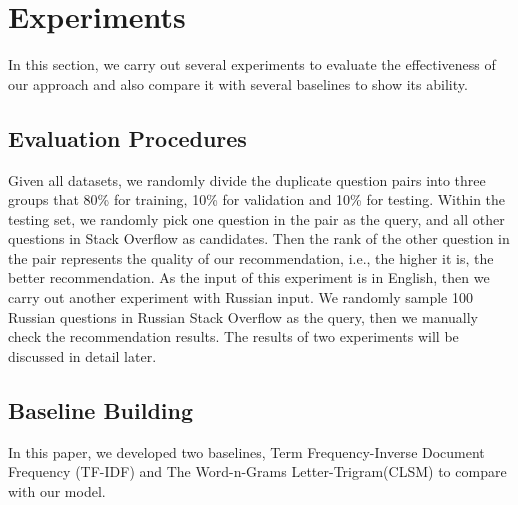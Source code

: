 \section{Experiments}
In this section, we carry out several experiments to evaluate the effectiveness of our approach and also compare it with several baselines to show its ability. 

\subsection{Evaluation Procedures}
Given all datasets, we randomly divide the duplicate question pairs into three groups that 80\% for training, 10\% for validation and 10\% for testing. 
Within the testing set, we randomly pick one question in the pair as the query, and all other questions in Stack Overflow as candidates.
Then the rank of the other question in the pair represents the quality of our recommendation, i.e., the higher it is, the better recommendation.
As the input of this experiment is in English, then we carry out another experiment with Russian input.
We randomly sample 100 Russian questions in Russian Stack Overflow as the query, then we manually check the recommendation results.
The results of two experiments will be discussed in detail later.
 
\begin{comment}
The 80\% subset is mix up with 0.15 million non-duplicate pairs for training the DSSM model, the first 10\% subset is used for validation, and the last 10\% subset is used for the comparison process between our approach and the baselines. 
The main data source of our research is from the Stack Exchange data dump of  1st Sep. 2017 [1]. As all the duplicate pairs have been manually marked by experts on Stack Overflow, we can collect 0.31 million duplicate question pairs. In addition, we can generate as many non-duplicate question pairs as we want.  \par
\end{comment}

\subsection{Baseline Building}
In this paper, we developed two baselines, Term Frequency-Inverse Document Frequency (TF-IDF) and The Word-n-Grams Letter-Trigram(CLSM) to compare with our model.

